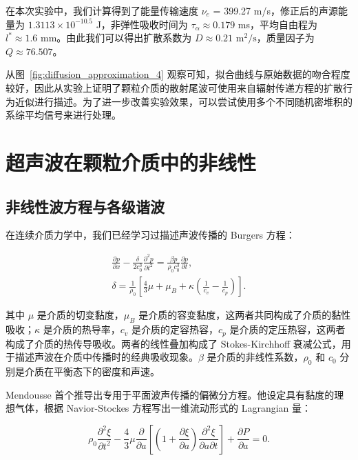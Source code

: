   在本次实验中，我们计算得到了能量传输速度 $\nu_{e}$ = 399.27 \unit{\meter}/\unit{\second}，修正后的声源能量为 $1.3113\times 10^{-10.5}$ \unit{J}，非弹性吸收时间为 $\tau_{\alpha}\approx 0.179$ \unit{\milli\second}，平均自由程为 $l^{*}\approx 1.6$ \unit{\milli\meter}。由此我们可以得出扩散系数为 $D\approx 0.21$ $\unit{\meter}^{2}/\unit{\second}$，质量因子为 $Q\approx 76.507$。

  从图~\ref{fig:diffusion_approximation_4} 观察可知，拟合曲线与原始数据的吻合程度较好，因此从实验上证明了颗粒介质的散射尾波可使用来自辐射传递方程的扩散行为近似进行描述。为了进一步改善实验效果，可以尝试使用多个不同随机密堆积的系综平均信号来进行处理。

\section{超声波在颗粒介质中的非线性}

\subsection{非线性波方程与各级谐波}

在连续介质力学中，我们已经学习过描述声波传播的 Burgers 方程：

\begin{align}
  \frac{\partial p}{\partial x} - \frac{\delta}{2c_{0}^{3}}\frac{\partial^{2}p}{\partial t^{2}} = \frac{\beta p}{\rho_{0}c_{0}^{3}}\frac{\partial p}{\partial t},\label{eq:burgers_equation_1}\\
  \delta = \frac{1}{\rho_{0}}\left[\frac{4}{3}\mu + \mu_{B} + \kappa\left(\frac{1}{c_{v}} - \frac{1}{c_{p}}\right)\right].
\end{align}

其中 $\mu$ 是介质的切变黏度，$\mu_{B}$ 是介质的容变黏度，这两者共同构成了介质的黏性吸收；$\kappa$ 是介质的热导率，$c_{v}$ 是介质的定容热容，$c_{p}$ 是介质的定压热容，这两者构成了介质的热传导吸收。两者的线性叠加构成了 Stokes-Kirchhoff 衰减公式，用于描述声波在介质中传播时的经典吸收现象。$\beta$ 是介质的非线性系数，$\rho_{0}$ 和 $c_{0}$ 分别是介质在平衡态下的密度和声速。

Mendousse 首个推导出专用于平面波声传播的偏微分方程。他设定具有黏度的理想气体，根据 Navior-Stockes 方程写出一维流动形式的 Lagrangian 量\cite{hamilton_nonlinear_1998}：

\begin{equation}
  \rho_{0}\frac{\partial^{2}\xi}{\partial t^{2}} - \frac{4}{3}\mu\frac{\partial }{\partial a}\left[\left(1 + \frac{\partial\xi}{\partial a}\right)\frac{\partial^{2}\xi}{\partial a\partial t}\right] + \frac{\partial P}{\partial a} = 0.\label{eq:mendousse_equation}
\end{equation}

